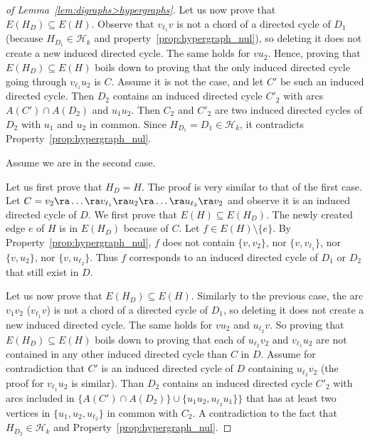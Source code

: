 \begin{proof}[of Lemma~\ref{lem:digraphs>hypergraphs}]
Let us now prove that $E(H_D) \subseteq E(H)$.  
Observe that  $v_{\ell_1}v$ is not a chord of a directed cycle of $D_1$ (because $H_{D_1} \in \mathcal {H}_k$ and  property~\ref{prop:hypergraph_nul}), so deleting it does not create a new induced directed cycle. The same holds for $vu_2$. 
Hence, proving that $E(H_D) \subseteq E(H)$  boils down to proving that the only induced directed cycle going through $v_{\ell_1}u_2$ is $C$. 
Assume it is not the case, and let $C'$ be such an induced directed cycle. 
Then $D_2$ contains an induced directed cycle $C'_2$   with arcs $A(C') \cap A(D_2)$ and $u_1u_2$. 
Then $C_2$ and $C'_2$ are two induced directed cycles of $D_2$ with  
$u_1$ and $u_2$ in common. Since $H_{D_1} = D_1\in \mathcal H_k$, it contradicts Property~\ref{prop:hypergraph_nul}. 
\smallskip 

Assume we are in the second case. 

Let us first prove that $H_D = H$.  The proof  is very similar to that of the first case.  
Let $C = v_2 \ra \dots \ra  v_{\ell_1} \ra u_2 \ra \dots \ra u_{\ell_2} \ra v_2$ and observe it is an induced directed cycle of $D$. 
We first prove that $E(H) \subseteq E(H_D)$. The newly created edge $e$ of $H$ is in $E(H_D)$ because of $C$. 
Let $f \in E(H) \setminus \{e\}$. 
By Property~\ref{prop:hypergraph_nul}, $f$ does not contain $\{v,v_{2}\}$, nor $\{v,v_{\ell_1}\}$, nor $\{v,u_2\}$, nor $\{v,u_{\ell_2}\}$. Thus $f$ corresponds to an induced directed cycle of $D_1$ or $D_2$ that still exist in $D$. 

Let us now prove that $E(H_D) \subseteq E(H)$. 
Similarly to the previous case, the arc $v_1v_2$ ($v_{\ell_1}v$) is not a chord of a directed cycle of $D_1$, so deleting it does not create a new induced directed cycle. The same holds for $vu_2$ and $u_{\ell_2}v$.  
So proving that $E(H_D) \subseteq E(H)$ boils down to proving that  each of $u_{\ell_2}v_2$ and $v_{\ell_1}u_2$ are not contained in any other induced directed cycle than $C$ in $D$. 
Assume for contradiction that $C'$ is an induced directed cycle of $D$ containing $u_{\ell_2}v_2$ (the proof for $v_{\ell_1}u_2$ is similar). 
Than $D_2$ contains an induced directed cycle $C'_2$ with arcs included in $\{A(C') \cap A(D_2) \} \cup \{u_1u_2, u_{\ell_2}u_1\}\}$ that has at least two vertices in $\{u_1, u_2, u_{\ell_2}\}$ in common with $C_2$. A contradiction to the fact that $H_{D_2} \in \mathcal H_k$ and Property~\ref{prop:hypergraph_nul}. 


\end{proof}
